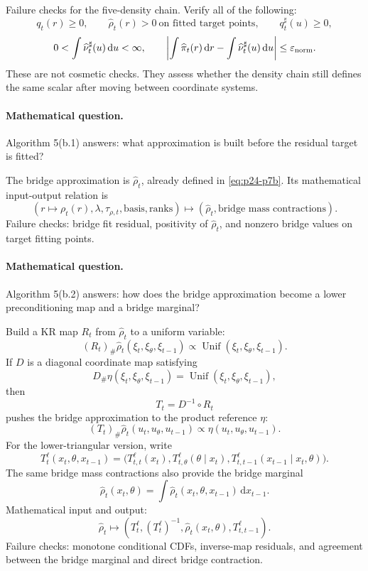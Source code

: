 \documentclass[11pt]{article}
\newcommand{\dd}{\,\mathrm d}
\begin{document}
Failure checks for the five-density chain.  Verify all of the following:
\[
    q_t(r)\ge0,\qquad
    \widehat\rho_t(r)>0\ \text{on fitted target points},\qquad
    q_t^\sharp(u)\ge0,
    \label{eq:p24-p7j}
\]
\[
    0<\int\widehat\nu_t^\sharp(u)\dd u<\infty,\qquad
    \left|
    \int\widehat\pi_t(r)\dd r-\int\widehat\nu_t^\sharp(u)\dd u
    \right|
    \le \varepsilon_{\rm norm}.
    \label{eq:p24-p7k}
\]
These are not cosmetic checks.  They assess whether the density chain still
defines the same scalar after moving between coordinate systems.

\paragraph{Mathematical question.}
Algorithm 5(b.1) answers: what approximation is built before the residual
target is fitted?

The bridge approximation is \(\widehat\rho_t\), already defined in \eqref{eq:p24-p7b}.  Its
mathematical input-output relation is
\[
    (r\mapsto \rho_t(r),\lambda,\tau_{\rho,t},\text{basis},\text{ranks})
    \mapsto
    (\widehat\rho_t,\text{bridge mass contractions}).
    \label{eq:p24-p7l}
\]
Failure checks: bridge fit residual, positivity of \(\widehat\rho_t\), and
nonzero bridge values on target fitting points.

\paragraph{Mathematical question.}
Algorithm 5(b.2) answers: how does the bridge approximation become a lower
preconditioning map and a bridge marginal?

Build a KR map \(R_t\) from \(\widehat\rho_t\) to a uniform variable:
\[
    (R_t)_\#\widehat\rho_t(\xi_t,\xi_\theta,\xi_{t-1})
    \propto
    \operatorname{Unif}(\xi_t,\xi_\theta,\xi_{t-1}).
    \label{eq:p24-p8}
\]
If \(D\) is a diagonal coordinate map satisfying
\[
    D_\#\eta(\xi_t,\xi_\theta,\xi_{t-1})
    =
    \operatorname{Unif}(\xi_t,\xi_\theta,\xi_{t-1}),
    \label{eq:p24-p9}
\]
then
\[
    T_t=D^{-1}\circ R_t
    \label{eq:p24-p10}
\]
pushes the bridge approximation to the product reference \(\eta\):
\[
    (T_t)_\#\widehat\rho_t(u_t,u_\theta,u_{t-1})
    \propto
    \eta(u_t,u_\theta,u_{t-1}).
    \label{eq:p24-p11}
\]
For the lower-triangular version, write
\[
    T_t^{\ell}(x_t,\theta,x_{t-1})
    =
    \bigl(
    T_{t,t}^{\ell}(x_t),
    T_{t,\theta}^{\ell}(\theta\mid x_t),
    T_{t,t-1}^{\ell}(x_{t-1}\mid x_t,\theta)
    \bigr).
    \label{eq:p24-p11a}
\]
The same bridge mass contractions also provide the bridge marginal
\[
    \widehat\rho_t(x_t,\theta)
    =
    \int\widehat\rho_t(x_t,\theta,x_{t-1})\dd x_{t-1}.
    \label{eq:p24-p11b}
\]
Mathematical input and output:
\[
    \widehat\rho_t
    \mapsto
    (T_t^\ell,(T_t^\ell)^{-1},\widehat\rho_t(x_t,\theta),
    T_{t,t-1}^\ell).
    \label{eq:p24-p11c}
\]
Failure checks: monotone conditional CDFs, inverse-map residuals, and agreement
between the bridge marginal and direct bridge contraction.
\end{document}
